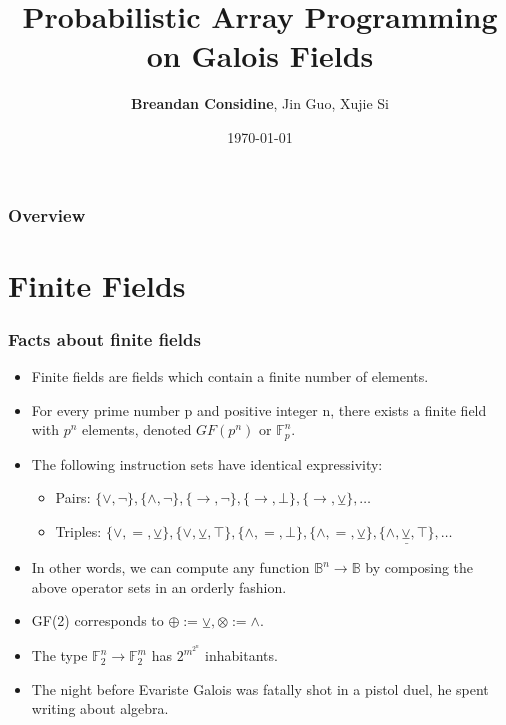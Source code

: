 \documentclass{beamer}
\title[Array Programming on $GF(2^n)$]{Probabilistic Array Programming on Galois Fields}
\author[Considine, Guo, Si]{\textbf{Breandan Considine}, Jin Guo, Xujie Si}
\institute[McGill]{
    McGill University, Mila IQIA\\
    \medskip
    \textit{breandan.considine@mail.mcgill.ca}
}
\date{\today}
\begin{document}
    \begin{frame}
        \titlepage
    \end{frame}

    \begin{frame}
        \frametitle{Overview}
        \tableofcontents
    \end{frame}

    \section{Finite Fields}\label{sec:finite-fields}


    \begin{frame}
        \frametitle{Facts about finite fields}
        \begin{itemize}
        \item Finite fields are fields which contain a finite number of elements.
        \item For every prime number p and positive integer n, there exists a finite field with $p^n$ elements, denoted $GF(p^n)$ or $\mathbb{F}_p^n$.
        \item The following instruction sets have identical expressivity:
        \begin{itemize}
        \item Pairs: $\{\vee, \neg\}, \{\wedge, \neg\}, \{\to, \neg\}, \{\to, \bot\}, \{\to, \veebar\}, \ldots$
        \item Triples: $\{\lor, =, \veebar\}, \{\lor, \veebar, \top\}, \{\land, =, \bot\}, \{\land, =, \veebar\}, \underline{\{\land, \veebar, \top\}}, \ldots$
        \end{itemize}
        \item In other words, we can compute any function $\mathbb{B}^n\rightarrow\mathbb{B}$ by composing the above operator sets in an orderly fashion.
        \item GF(2) corresponds to $\oplus := \veebar, \otimes := \land$.
        \item The type $\mathbb{F}_2^n\rightarrow\mathbb{F}_2^m$ has $2^{m^{2^{n}}}$ inhabitants.
        \item The night before Evariste Galois was fatally shot in a pistol duel, he spent writing about algebra.
        \end{itemize}
    \end{frame}
\end{document}
